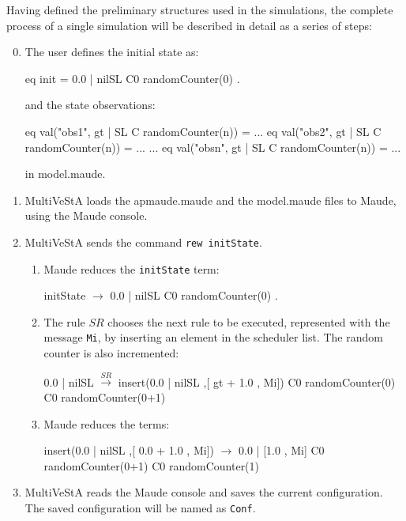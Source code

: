 Having defined the preliminary structures used in the simulations, the complete process of a single simulation will be described in detail as a series of steps:
\begin{enumerate}
    \setcounter{enumi}{-1}
    \item The user defines the initial state as:
    \begin{maude}
    
eq init = {0.0 | nilSL} C0 randomCounter(0) . \end{maude}
    and the state observations:
    \begin{maude}
    
eq val("obs1", {gt | SL} {C randomCounter(n)}) = ...
eq val("obs2", {gt | SL} {C randomCounter(n)}) = ...
...
eq val("obsn", {gt | SL} {C randomCounter(n)}) = ...\end{maude}
    in model.maude.
    \item MultiVeStA loads the apmaude.maude and the model.maude files to Maude, using the Maude console.
    \item MultiVeStA sends the command \texttt{rew initState}. 
    \begin{enumerate}
        \item Maude reduces the \texttt{initState} term:
        \begin{maude}

initState $\rightarrow$ {0.0 | nilSL} {C0  randomCounter(0)} .\end{maude}
        \item The rule $SR$ chooses the next rule to be executed, represented with the message \texttt{Mi}, by inserting an element in the scheduler list. The random counter is also incremented:
        \begin{maude}

{0.0 | nilSL }        $\xrightarrow{SR}$   insert({0.0 | nilSL },[ gt + 1.0 , Mi])
{C0 randomCounter(0)}       {C0 randomCounter(0+1)}\end{maude}
        \item Maude reduces the terms:
        \begin{maude}
        
insert({0.0 | nilSL },[ 0.0 + 1.0 , Mi]) $\rightarrow$ {0.0 | [1.0 , Mi] } 
{C0 randomCounter(0+1)}                     {C0 randomCounter(1)}\end{maude}
    \end{enumerate}

\item MultiVeStA reads the Maude console and saves the current configuration. The saved configuration will be named as \texttt{Conf}.


\end{enumerate}
